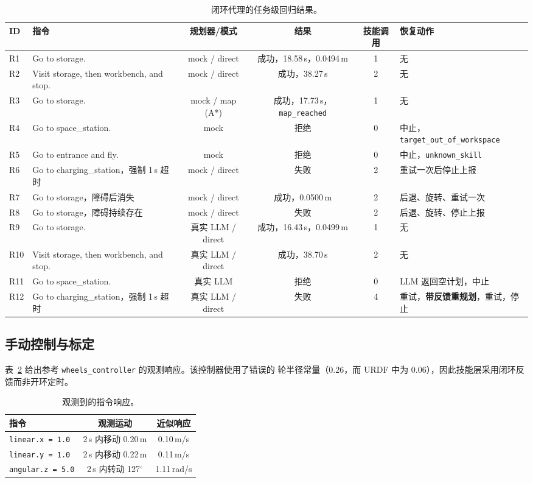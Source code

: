 \documentclass[10pt,twocolumn]{ctexart}
\begin{document}
\begin{table}[t]
\centering
\caption{闭环代理的任务级回归结果。}
\label{tab:results}
\small
\begin{tabular}{llcccl}
\toprule
ID & 指令 & 规划器/模式 & 结果 & 技能调用 & 恢复动作 \\
\midrule
R1 & Go to storage. & mock / direct & 成功，18.58\,s，0.0494\,m & 1 & 无 \\
R2 & Visit storage, then workbench, and stop. & mock / direct & 成功，38.27\,s & 2 & 无 \\
R3 & Go to storage. & mock / map (A*) & 成功，17.73\,s，\texttt{map\_reached} & 1 & 无 \\
R4 & Go to space\_station. & mock & 拒绝 & 0 & 中止，\texttt{target\_out\_of\_workspace} \\
R5 & Go to entrance and fly. & mock & 拒绝 & 0 & 中止，\texttt{unknown\_skill} \\
R6 & Go to charging\_station，强制 1\,s 超时 & mock / direct & 失败 & 2 & 重试一次后停止上报 \\
R7 & Go to storage，障碍后消失 & mock / direct & 成功，0.0500\,m & 2 & 后退、旋转、重试一次 \\
R8 & Go to storage，障碍持续存在 & mock / direct & 失败 & 2 & 后退、旋转、停止上报 \\
R9 & Go to storage. & 真实 LLM / direct & 成功，16.43\,s，0.0499\,m & 1 & 无 \\
R10 & Visit storage, then workbench, and stop. & 真实 LLM / direct & 成功，38.70\,s & 2 & 无 \\
R11 & Go to space\_station. & 真实 LLM & 拒绝 & 0 & LLM 返回空计划，中止 \\
R12 & Go to charging\_station，强制 1\,s 超时 & 真实 LLM / direct & 失败 & 4 & 重试，\textbf{带反馈重规划}，重试，停止 \\
\bottomrule
\end{tabular}
\end{table}

\subsection{手动控制与标定}
表~\ref{tab:calib} 给出参考 \texttt{wheels\_controller} 的观测响应。该控制器使用了错误的
轮半径常量（0.26，而 URDF 中为 0.06），因此技能层采用闭环反馈而非开环定时。

\begin{table}[t]
\centering
\caption{观测到的指令响应。}
\label{tab:calib}
\small
\begin{tabular}{lcc}
\toprule
指令 & 观测运动 & 近似响应 \\
\midrule
\texttt{linear.x = 1.0} & 2\,s 内移动 0.20\,m & 0.10\,m/s \\
\texttt{linear.y = 1.0} & 2\,s 内移动 0.22\,m & 0.11\,m/s \\
\texttt{angular.z = 5.0} & 2\,s 内转动 127$^\circ$ & 1.11\,rad/s \\
\bottomrule
\end{tabular}
\end{table}
\end{document}
